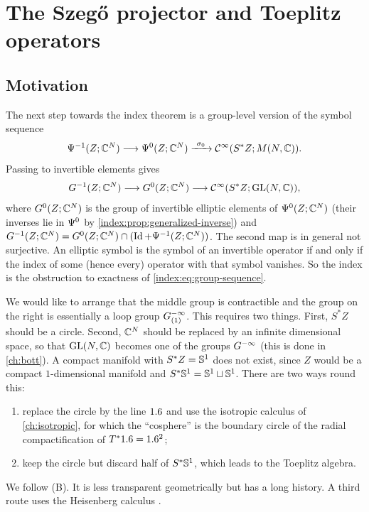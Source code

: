 \section{The Szeg\H{o} projector and Toeplitz operators}\label{index:sec:toeplitz}

\subsection{Motivation}
The next step towards the index theorem is a group-level version of the symbol
sequence
\begin{equation*}
  \Psido{-1}(Z;\C^N)\longrightarrow\Psido0(Z;\C^N)\xrightarrow{\ \sigma_0\ }
  \CI(S^*Z;M(N,\C)).
\end{equation*}
Passing to invertible elements gives
\begin{equation}\label{index:eq:group-sequence}
  G^{-1}(Z;\mathbb{C}^N)\longrightarrow G^0(Z;\mathbb{C}^N)\longrightarrow
  \mathcal{C}^\infty(S^*Z;\operatorname{GL}(N,\mathbb{C})),
\end{equation}
where $G^0(Z;\mathbb{C}^N)$ is the group of invertible elliptic elements of
$\Psi^{0}(Z;\mathbb{C}^N)$ (their inverses lie in $\Psi^{0}$ by
\cref{index:prop:generalized-inverse}) and
$G^{-1}(Z;\mathbb{C}^N)=G^0(Z;\mathbb{C}^N)\cap(\operatorname{Id}+\Psi^{-1}(Z;\mathbb{C}^N))$. The second map is
in general not surjective. An elliptic symbol is the symbol of an
invertible operator if and only if the index of some (hence every) operator
with that symbol vanishes. So the index is the obstruction to exactness of
\eqref{index:eq:group-sequence}.

We would like to arrange that the middle group is contractible and the group on
the right is essentially a loop group $G^{-\infty}_{(1)}$. This requires two things.
First, $S^*Z$ should be a circle. Second, $\mathbb{C}^N$ should be replaced by an
infinite dimensional space, so that $\operatorname{GL}(N,\mathbb{C})$ becomes one of the groups
$G^{-\infty}$ (this is done in \cref{ch:bott}). A compact manifold with
$S^*Z=\mathbb{S}^1$ does not exist, since $Z$ would be a compact
$1$-dimensional manifold and $S^*\mathbb{S}^1=\mathbb{S}^1\sqcup\mathbb{S}^1$. There
are two ways round this:
\begin{enumerate}[label=(\Alph*)]
\item replace the circle by the line $1.6$ and use the isotropic calculus of
  \cref{ch:isotropic}, for which the ``cosphere'' is the boundary circle of
  the radial compactification of $T^*1.6=1.6^2$;
\item keep the circle but discard half of $S^*\mathbb{S}^1$, which leads to the
  Toeplitz algebra.
\end{enumerate}
We follow (B). It is less transparent geometrically but has a long history. A
third route uses the Heisenberg calculus \cite{Epstein-Melrose}.

